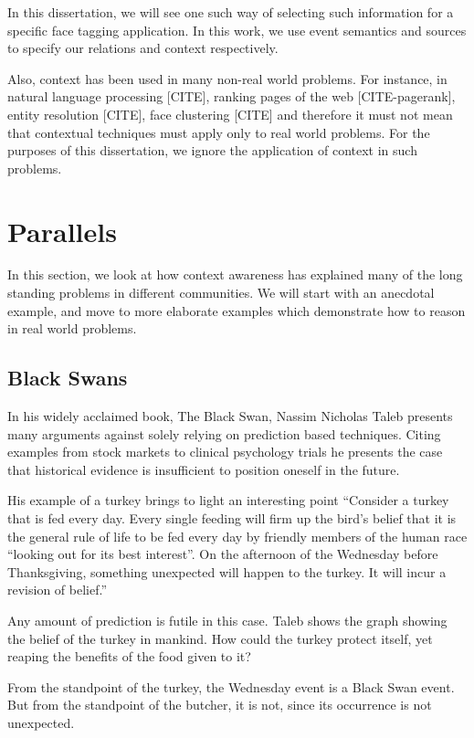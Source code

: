 In this dissertation, we will see one such way of selecting such information for a specific face tagging application. In this work, we use event semantics and sources to specify our relations and context respectively.

Also, context has been used in many non-real world problems. For instance, in natural language processing [CITE], ranking pages of the web [CITE-pagerank], entity resolution [CITE], face clustering [CITE] and therefore it must not mean that contextual techniques must apply only to real world problems. For the purposes of this dissertation, we ignore the application of context in such problems.

\section{Parallels}
In this section, we look at how context awareness has explained many of the long standing problems in different communities. We will start with an anecdotal example, and move to more elaborate examples which demonstrate how to reason in real world problems.

\subsection{Black Swans}
In his widely acclaimed book, The Black Swan, Nassim Nicholas Taleb presents many arguments against solely relying on prediction based techniques. Citing examples from stock markets to clinical psychology trials he presents the case that historical evidence is insufficient to position oneself in the future. 

His example of a turkey brings to light an interesting point ``Consider a turkey that is fed every day. Every single feeding will firm up the bird's belief that it is the general rule of life to be fed every day by friendly members of the human race ``looking out for its best interest''. On the afternoon of the Wednesday before Thanksgiving, something unexpected will happen to the turkey. It will incur a revision of belief.''

Any amount of prediction is futile in this case. Taleb shows the graph showing the belief of the turkey in mankind. How could the turkey protect itself, yet reaping the benefits of the food given to it? 

From the standpoint of the turkey, the Wednesday event is a Black Swan event. But from the standpoint of the butcher, it is not, since its occurrence is not unexpected.

